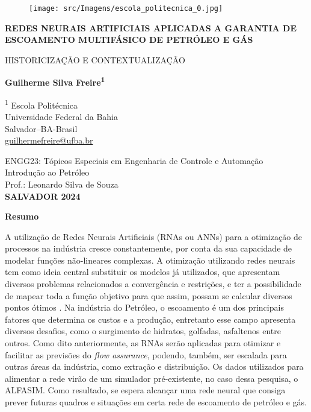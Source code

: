 \documentclass{article}[12pt, openright, oneside, a4paper, portuguese]
\begin{document}
\pagestyle{empty}
\begin{figure}
    \centering
    \texttt{[image: src/Imagens/escola\_politecnica\_0.jpg]}
\end{figure}
\begin{center}
\large{
\textbf{REDES NEURAIS ARTIFICIAIS APLICADAS A GARANTIA DE ESCOAMENTO MULTIFÁSICO DE PETRÓLEO E GÁS}

\vspace{0.5cm}
HISTORICIZAÇÃO E CONTEXTUALIZAÇÃO
}

\vspace{2cm}
\large{\textbf{Guilherme Silva Freire\textsuperscript{1}}}

\vspace{1cm}
\textsuperscript{1} Escola Politécnica\\
Universidade Federal da Bahia\\
Salvador–BA-Brasil\\

\vspace{1cm}
\href{mailto:guilhermefreire@ufba.br}{guilhermefreire@ufba.br}

\vspace{2cm}
\large{
ENGG23: Tópicos Especiais em Engenharia de Controle e Automação\\
Introdução ao Petróleo\\
\vspace{1cm}
Prof.: Leonardo Silva de Souza
}\\

\vspace{2cm}
\large{\textbf{SALVADOR 2024}}
\end{center}

\newpage
\Large{\textbf{Resumo}}

	A utilização de Redes Neurais Artificiais (RNAs ou ANNs) para a otimização de processos na indústria cresce constantemente, por conta da sua capacidade de modelar funções não-lineares complexas. A otimização utilizando redes neurais tem como ideia central substituir os modelos já utilizados, que apresentam diversos problemas relacionados a convergência e restrições, e ter a possibilidade de mapear toda a função objetivo para que assim, possam se calcular diversos pontos ótimos \cite{NASCIMENTO20002303}. Na indústria do Petróleo, o escoamento é um dos principais fatores que determina os custos e a produção, entretanto esse campo apresenta diversos desafios, como o surgimento de hidratos, golfadas, asfaltenos entre outros. Como dito anteriormente, as RNAs serão aplicadas para otimizar e facilitar as previsões do \textit{flow assurance}, podendo, também, ser escalada para outras áreas da indústria, como extração e distribuição. Os dados utilizados para alimentar a rede virão de um simulador pré-existente, no caso dessa pesquisa, o ALFASIM. Como resultado, se espera alcançar uma rede neural que consiga prever futuras quadros e situações em certa rede de escoamento de petróleo e gás.
\end{document}

